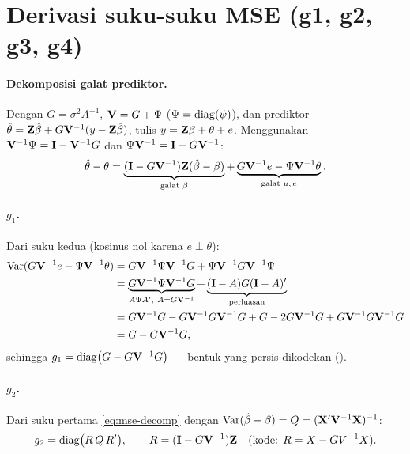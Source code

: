 \section{Derivasi suku-suku MSE (g1, g2, g3, g4)}\label{app:g}

\paragraph{Dekomposisi galat prediktor.} Dengan $G=\sigma^2A^{-1}$,
$\mathbf{V}=G+\Psi$ ($\Psi=\operatorname{diag}(\psi)$), dan prediktor
$\hat\theta=\mathbf{Z}\hat\beta+G\mathbf{V}^{-1}(y-\mathbf{Z}\hat\beta)$, tulis
$y=\mathbf{Z}\beta+\theta+e$. Menggunakan $\mathbf{V}^{-1}\Psi=\mathbf{I}-\mathbf{V}^{-1}G$ dan
$\Psi\mathbf{V}^{-1}=\mathbf{I}-G\mathbf{V}^{-1}$:
\begin{equation}
  \hat\theta-\theta
  =\underbrace{(\mathbf{I}-G\mathbf{V}^{-1})\mathbf{Z}(\hat\beta-\beta)}_{\text{galat }\beta}
   +\underbrace{G\mathbf{V}^{-1}e-\Psi\mathbf{V}^{-1}\theta}_{\text{galat }u,\,e}.
  \label{eq:mse-decomp}
\end{equation}
\paragraph{$g_1$.} Dari suku kedua (kosinus nol karena $e\perp\theta$):
\begin{align}
  \operatorname{Var}(G\mathbf{V}^{-1}e-\Psi\mathbf{V}^{-1}\theta)
  &=G\mathbf{V}^{-1}\Psi\mathbf{V}^{-1}G+\Psi\mathbf{V}^{-1}G\mathbf{V}^{-1}\Psi\notag\\
  &=\underbrace{G\mathbf{V}^{-1}\Psi\mathbf{V}^{-1}G}_{A\Psi A',\ A=G\mathbf{V}^{-1}}
    +\underbrace{(\mathbf{I}-A)G(\mathbf{I}-A)'}_{\text{perluasan}}\notag\\
  &=G\mathbf{V}^{-1}G-G\mathbf{V}^{-1}G\mathbf{V}^{-1}G+G-2G\mathbf{V}^{-1}G+G\mathbf{V}^{-1}G\mathbf{V}^{-1}G\notag\\
  &=G-G\mathbf{V}^{-1}G,
  \label{eq:g1-deriv}
\end{align}
sehingga $g_1=\operatorname{diag}\bigl(G-G\mathbf{V}^{-1}G\bigr)$ --- bentuk yang persis
dikodekan ().

\paragraph{$g_2$.} Dari suku pertama \eqref{eq:mse-decomp} dengan
$\operatorname{Var}(\hat\beta-\beta)=Q=(\mathbf{X}'\mathbf{V}^{-1}\mathbf{X})^{-1}$:
\begin{equation}
  g_2=\operatorname{diag}\bigl(R\,Q\,R'\bigr),\qquad R=(\mathbf{I}-G\mathbf{V}^{-1})\mathbf{Z}
  \quad(\text{kode: }R=X-GV^{-1}X).
  \label{eq:g2-deriv}
\end{equation}

